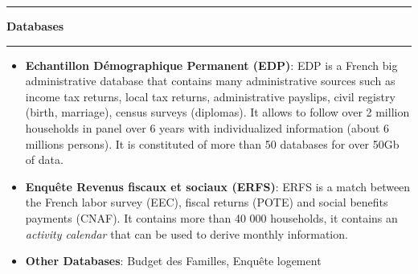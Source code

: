\documentclass[a4paper,11pt]{article} %
\newcommand{\titre}[1]{%
	\begin{center}
	\rule{\textwidth}{1pt}
	\par\vspace{0.1cm}
        \textbf{\large #1}
	\par\rule{\textwidth}{1pt}
	\end{center}
	}
\begin{document}
\titre{Databases}

\begin{itemize}
\item \textbf{Echantillon Démographique Permanent (EDP)}:  EDP is a French big administrative database that contains many administrative sources such as income tax returns, local tax returns, administrative payslips, civil registry (birth, marriage), census surveys (diplomas). It allows to follow over 2 million households in panel over 6 years with individualized information (about 6 millions persons). It is constituted of more than 50 databases for over 50Gb of data.
\item \textbf{Enquête Revenus fiscaux et sociaux (ERFS)}:  ERFS is a match between the French labor survey (EEC), fiscal returns (POTE) and social benefits payments (CNAF). It contains more than 40 000 households, it contains an \emph{activity calendar} that can be used to derive monthly information.

\item \textbf{Other Databases}:  Budget des Familles, Enquête logement
\end{itemize}
\newpage
\end{document}
